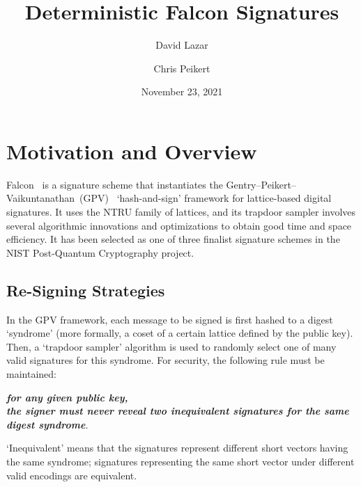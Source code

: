 \documentclass[11pt]{article}
\begin{document}
\title{Deterministic Falcon Signatures}

\date{November 23, 2021}

\author{David Lazar}
\author{Chris Peikert}

\maketitle

\listoffixmes


\section{Motivation and Overview}
\label{sec:motivation-overview}

Falcon~\cite{falcon} is a signature scheme that instantiates the
Gentry--Peikert--Vaikuntanathan~(GPV)~\cite{DBLP:conf/stoc/GentryPV08}
`hash-and-sign' framework for lattice-based digital signatures. It
uses the NTRU family of lattices, and its trapdoor sampler involves
several algorithmic innovations and optimizations to obtain good time
and space efficiency. It has been selected as one of three finalist
signature schemes in the NIST Post-Quantum Cryptography project.

\subsection{Re-Signing Strategies}
\label{sec:re-signing}

In the GPV framework, each message to be signed is first hashed to a
digest `syndrome' (more formally, a coset of a certain lattice defined
by the public key). Then, a `trapdoor sampler' algorithm is used to
randomly select one of many valid signatures for this syndrome. For
security, the following rule must be maintained:
\begin{center}
  \emph{\textbf{for any given public key,\\the signer must never
      reveal two inequivalent signatures for the same digest
      syndrome}.}
\end{center}
`Inequivalent' means that the signatures represent different short
vectors having the same syndrome; signatures representing the same
short vector under different valid encodings are equivalent.
\end{document}
